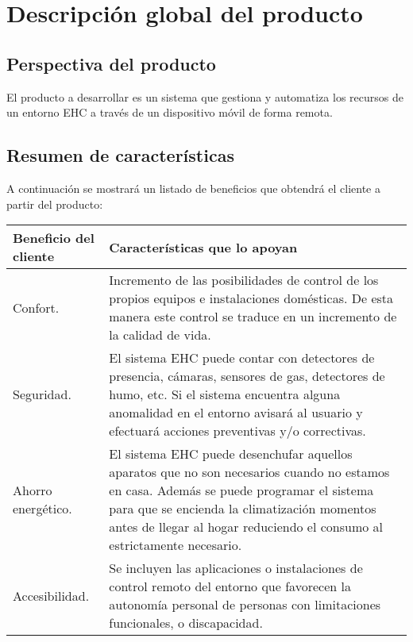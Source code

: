 \chapter{Descripción global del producto}

\section{Perspectiva del producto}
    El producto a desarrollar es un sistema que gestiona y automatiza los recursos de un entorno EHC a través de un dispositivo móvil de forma remota.

\section{Resumen de características}
    A continuación se mostrará un listado de beneficios que obtendrá el cliente a partir del producto: \\ \par
    \begin{tabular}{|p{8cm}|p{8cm}|}
        \hline \textbf{Beneficio del cliente} & \textbf{Características que lo apoyan} \\
        \hline  Confort. & Incremento de las posibilidades de control de los
        propios equipos e instalaciones domésticas. De esta manera este control se traduce en un incremento de la calidad de vida.\\
         \hline Seguridad. &  El sistema EHC puede contar con detectores de presencia, cámaras, sensores de gas, detectores de humo, etc. Si el sistema encuentra alguna anomalidad en el entorno avisará al usuario y efectuará acciones preventivas y/o correctivas.\\
         \hline Ahorro energético. & El sistema EHC puede desenchufar aquellos aparatos que no son necesarios cuando no estamos en casa. Además se puede programar el sistema para que se encienda la climatización momentos antes de llegar al hogar reduciendo el consumo al estrictamente necesario.\\
        \hline Accesibilidad. & Se incluyen las aplicaciones o instalaciones de control remoto del entorno que favorecen la autonomía personal de personas con limitaciones funcionales, o discapacidad.\\
        \hline
    \end{tabular}

